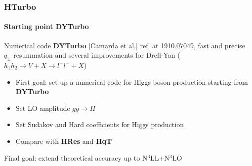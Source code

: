 \documentclass[aspectratio=43]{beamer}
\begin{document}
\begin{frame}

	\frametitle{HTurbo}
	\framesubtitle{Starting point DYTurbo}

	Numerical code \textbf{DYTurbo} {\color{blue}[Camarda et al.]} ref. at {\color{blue} \href{https://arxiv.org/abs/1910.07049}{1910.07049}}, fast and precise $q_{\perp}$ resummation and several improvements for Drell-Yan ($h_{1}h_{2} \rightarrow V + X \rightarrow l^{+}l^{-} + X$) 
	
	\begin{itemize}
		\item {\color{red}First goal}: set up a numerical code for Higgs boson production starting from  \textbf{DYTurbo}
		\item Set LO amplitude $gg \rightarrow H$
		\item Set Sudakov and Hard coefficients for Higgs production
		\item Compare with \textbf{HRes} and \textbf{HqT}
	\end{itemize}

	\vspace{0.5 cm}

	{\color{red}Final goal}: extend theoretical accuracy up to N$^{3}$LL+N$^{3}$LO

\end{frame}
\end{document}
